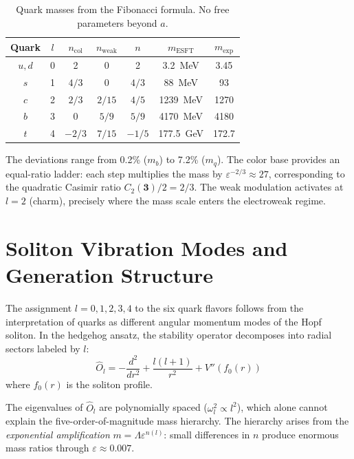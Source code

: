 ﻿\documentclass[twocolumn,preprintnumbers,amsmath,amssymb,prd]{revtex4-2}
\newcommand{\koppa}{\text{\usefont{T1}{lmr}{m}{n}\symbol{"DE}}}%
\renewcommand{\koppa}{a}%
\begin{document}
\begin{table}[h]
\caption{Quark masses from the Fibonacci formula. No free parameters beyond $\koppa$.}
\label{tab:quarks}
\begin{ruledtabular}
\begin{tabular}{ccccccc}
Quark & $l$ & $n_{\text{col}}$ & $n_{\text{weak}}$ & $n$ & $m_{\text{ESFT}}$ & $m_{\text{exp}}$ \\
\hline
$u,d$ & 0 & 2 & 0 & 2 & 3.2~MeV & 3.45 \\
$s$ & 1 & $4/3$ & 0 & $4/3$ & 88~MeV & 93 \\
$c$ & 2 & $2/3$ & $2/15$ & $4/5$ & 1239~MeV & 1270 \\
$b$ & 3 & 0 & $5/9$ & $5/9$ & 4170~MeV & 4180 \\
$t$ & 4 & $-2/3$ & $7/15$ & $-1/5$ & 177.5~GeV & 172.7 \\
\end{tabular}
\end{ruledtabular}
\end{table}

The deviations range from 0.2\% ($m_b$) to 7.2\% ($m_q$). The color base provides an equal-ratio ladder: each step multiplies the mass by $\varepsilon^{-2/3} \approx 27$, corresponding to the quadratic Casimir ratio $C_2(\mathbf{3})/2 = 2/3$. The weak modulation activates at $l=2$ (charm), precisely where the mass scale enters the electroweak regime.

\section{Soliton Vibration Modes and Generation Structure}
\label{sec:vibration}

The assignment $l = 0, 1, 2, 3, 4$ to the six quark flavors follows from the interpretation of quarks as different angular momentum modes of the Hopf soliton. In the hedgehog ansatz, the stability operator decomposes into radial sectors labeled by $l$:
\begin{equation}
\hat{O}_l = -\frac{d^2}{dr^2} + \frac{l(l+1)}{r^2} + V''(f_0(r))
\end{equation}
where $f_0(r)$ is the soliton profile.

The eigenvalues of $\hat{O}_l$ are polynomially spaced ($\omega_l^2 \propto l^2$), which alone cannot explain the five-order-of-magnitude mass hierarchy. The hierarchy arises from the \emph{exponential amplification} $m = \Lambda\varepsilon^{n(l)}$: small differences in $n$ produce enormous mass ratios through $\varepsilon \approx 0.007$.
\end{document}
